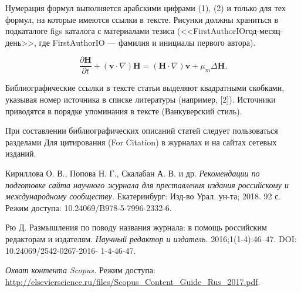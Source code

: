 \documentclass[12pt]{report}
\begin{document}
Нумерация формул выполняется арабскими цифрами (1), (2) и только для тех формул, на которые имеются ссылки в тексте.
Рисунки должны храниться в подкаталоге figs каталога с материалами тезиса (<<FirstAuthorIOгод-месяц-день>>, где FirstAuthorIO --- фамилия и инициалы первого автора).

\begin{equation} \label{eq:Cheb19SurMathGalkin__1_} 
\frac{\partial \textbf{H}}{\partial t} +\left(\textbf{v}\cdot \nabla \right)\textbf{H}=\left(\textbf{H}\cdot \nabla \right)\textbf{v}+\mu _{m} \Delta \textbf{H}.
\end{equation} 

Библиографические ссылки в тексте статьи выделяют квадратными скобками,
указывая номер источника в списке литературы (например, [2]). Источники приводятся в порядке упоминания в тексте (Ванкуверский стиль).

При составлении библиографических описаний статей следует пользоваться разделами Для цитирования (For Citation) в журналах и на сайтах
сетевых изданий.



\begin{thebibliography}{9}

Кириллова О. В., Попова Н. Г., Скалабан А. В. и др. {\it Рекомендации по подготовке сайта научного журнала для преставления издания российскому и международному
сообществу.} Екатеринбург: Изд-во Урал. ун-та; 2018. 92 с. Режим доступа: 10.24069/B978-5-7996-2332-6.

Рю Д. Размышления по поводу названия журнала: в помощь российским редакторам и издателям. {\it Научный редактор и издатель.} 2016;1(1-4):46–47. DOI: 10.24069/2542-0267-2016-
1-4-46-47.

{\it Охват контента Scopus.} Режим доступа: \url{http://elsevierscience.ru/files/Scopus_Content_Guide_Rus_2017.pdf}.

\end{thebibliography}
\end{document}

